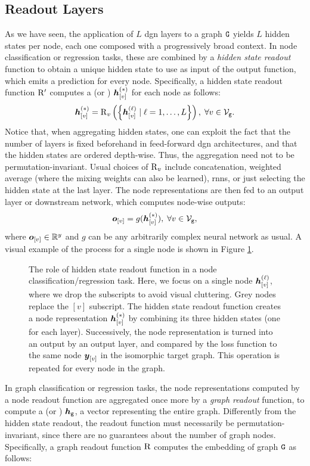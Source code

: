\subsection{Readout Layers}
As we have seen, the application of $L$ \gls{dgn} layers to a graph $\GraphU{G}$ yields $L$ hidden states per node, each one composed with a progressively broad context. In node classification or regression tasks, these are combined by a \emph{hidden state readout} function to obtain a unique hidden state to use as input of the output function, which emits a prediction for every node. Specifically, a hidden state readout function $\mathrm{R'}$ computes a  (or ) $\StateVector{v}{*}$ for each node as follows:
$$\StateVector{v}{*} = \Op{R}_{v}\Par{\Set{\StateVector{v}{\ell} \mid \ell = 1, \ldots, L}},\;  \forall v \in \Nodes{g}. $$
Notice that, when aggregating hidden states, one can exploit the fact that the number of layers is fixed beforehand in feed-forward \gls{dgn} architectures, and that the hidden states are ordered depth-wise. Thus, the aggregation need not to be permutation-invariant. Usual choices of $\operatorname{R}_{v}$ include concatenation, weighted average (where the mixing weights can also be learned), \gls{rnn}s, or just selecting the hidden state at the last layer. The node representations are then fed to an output layer or downstream network, which computes node-wise outputs:
$$\Elem{o}{v} = g(\StateVector{v}{*}),\; \forall v \in \Nodes{g},$$
where $\Elem{o}{v} \in \Real^y$ and $g$ can be any arbitrarily complex neural network as usual. A visual example of the process for a single node is shown in Figure \ref{fig:node-readout}.
\begin{figure}[h!]
    \centering
    \resizebox{.6\textwidth}{!}{}
    \caption{The role of hidden state readout function in a node classification/regression task. Here, we focus on a single node $\StateVector{v}{\ell}$, where we drop the subscripts to avoid visual cluttering. Grey nodes replace the $[v]$ subscript. The hidden state readout function creates a node representation $\StateVector{v}{*}$ by combining its three hidden states (one for each layer). Successively, the node representation is turned into an output by an output layer, and compared by the loss function to the same node $\Elem{y}{v}$ in the isomorphic target graph. This operation is repeated for every node in the graph.}
    \label{fig:node-readout}
\end{figure}
In graph classification or regression tasks, the node representations computed by a node readout function are aggregated once more by a \emph{graph readout} function, to compute a  (or ) $\GraphRepr{g}$, \ie a vector representing the entire graph. Differently from the hidden state readout, the readout function must necessarily be permutation-invariant, since there are no guarantees about the number of graph nodes. Specifically, a graph readout function $\mathrm{R}$ computes the embedding of graph $\GraphU{g}$ as follows:

